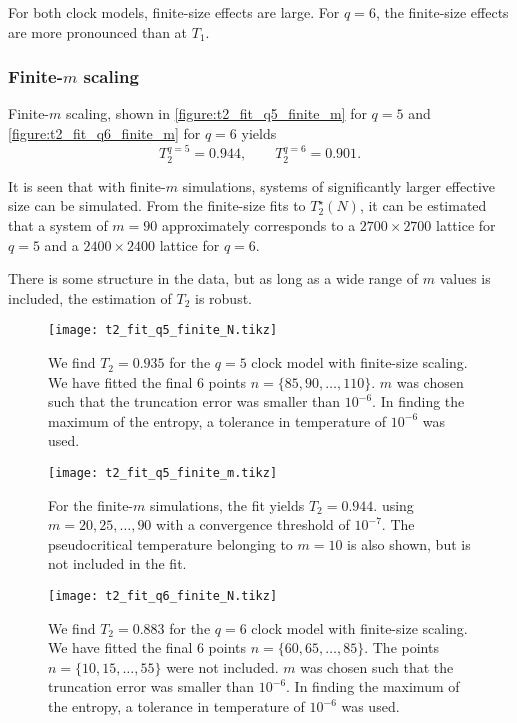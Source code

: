 For both clock models, finite-size effects are large. For $q = 6$, the finite-size effects are more pronounced
than at $T_1$.

\subsubsection{Finite-$m$ scaling}
Finite-$m$ scaling, shown in \autoref{figure:t2_fit_q5_finite_m} for $q = 5$ and \autoref{figure:t2_fit_q6_finite_m}
for $q = 6$ yields
\begin{equation}
  T_2^{q = 5} = 0.944, \qquad T_2^{q = 6} = 0.901.
\end{equation}

It is seen that with finite-$m$ simulations,
systems of significantly larger effective size can be simulated.
From the finite-size fits to $T_2^{\star}(N)$, it can be estimated that a system of $m = 90$ approximately corresponds
to a $2700 \times 2700$ lattice for $q = 5$ and a $2400 \times 2400$ lattice for $q = 6$.

There is some structure in the data, but as long as a wide range of $m$ values is included,
the estimation of $T_2$ is robust.

\begin{figure}
  \centering
  \texttt{[image: t2\_fit\_q5\_finite\_N.tikz]}
  \caption{We find $T_2 = 0.935$ for the $q = 5$ clock model with finite-size scaling.
  We have fitted the final 6 points $n = \{ 85, 90, \dots, 110 \}$.
  $m$ was chosen such that the truncation error was smaller than $10^{-6}$.
  In finding the maximum of the entropy, a tolerance in temperature of $10^{-6}$ was used.}
  \label{figure:t2_fit_q5_finite_N}
\end{figure}

\begin{figure}
  \centering
  \texttt{[image: t2\_fit\_q5\_finite\_m.tikz]}
  \caption{
  For the finite-$m$ simulations, the fit yields $T_2 = 0.944$.
  using $m = 20, 25, \dots,
  90$ with a convergence threshold of $10^{-7}$.
  The pseudocritical temperature belonging to $m = 10$ is also shown,
  but is not included in the fit.}\label{figure:t2_fit_q5_finite_m}
\end{figure}

\begin{figure}
  \centering
  \texttt{[image: t2\_fit\_q6\_finite\_N.tikz]}
  \caption{We find $T_2 = 0.883$ for the $q = 6$ clock model with finite-size scaling.
  We have fitted the final 6 points $n = \{ 60, 65, \dots, 85 \}$.
  The points $n = \{ 10, 15, \dots, 55 \}$ were not included.
  $m$ was chosen such that the truncation error was smaller than $10^{-6}$.
  In finding the maximum of the entropy, a tolerance in temperature of $10^{-6}$ was used.}
  \label{figure:t2_fit_q6_finite_N}
\end{figure}


